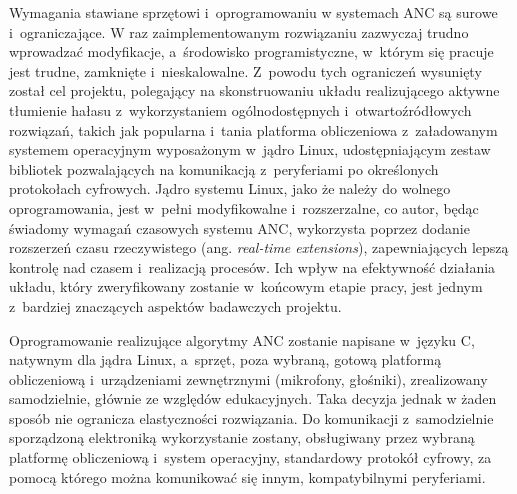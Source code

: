Wymagania stawiane sprzętowi i~oprogramowaniu w systemach ANC są surowe
i~ograniczające. W raz zaimplementowanym rozwiązaniu zazwyczaj trudno wprowadzać
modyfikacje, a~środowisko programistyczne, w~którym się pracuje jest trudne,
zamknięte i~nieskalowalne. Z~powodu tych ograniczeń wysunięty został cel
projektu, polegający na skonstruowaniu układu realizującego aktywne tłumienie
hałasu z~wykorzystaniem ogólnodostępnych i~otwartoźródłowych rozwiązań, takich
jak popularna i~tania platforma obliczeniowa z~załadowanym systemem operacyjnym
wyposażonym w~jądro Linux, udostępniającym zestaw bibliotek pozwalających na
komunikacją z~peryferiami po określonych protokołach cyfrowych. Jądro systemu
Linux, jako że należy do wolnego oprogramowania, jest w~pełni modyfikowalne
i~rozszerzalne, co autor, będąc świadomy wymagań czasowych systemu ANC,
wykorzysta poprzez dodanie rozszerzeń czasu rzeczywistego (ang.
\textit{real-time extensions}), zapewniających lepszą kontrolę nad czasem
i~realizacją procesów. Ich wpływ na efektywność działania układu, który
zweryfikowany zostanie w~końcowym etapie pracy, jest jednym z~bardziej
znaczących aspektów badawczych projektu. \par Oprogramowanie realizujące
algorytmy ANC zostanie napisane w~języku C, natywnym dla jądra Linux, a~sprzęt,
poza wybraną, gotową platformą obliczeniową i~urządzeniami zewnętrznymi
(mikrofony, głośniki), zrealizowany samodzielnie, głównie ze względów
edukacyjnych. Taka decyzja jednak w żaden sposób nie ogranicza elastyczności
rozwiązania. Do komunikacji z~samodzielnie sporządzoną elektroniką wykorzystanie
zostany, obsługiwany przez wybraną platformę obliczeniową i~system operacyjny,
standardowy protokół cyfrowy, za pomocą którego można komunikować się innym,
kompatybilnymi peryferiami.

